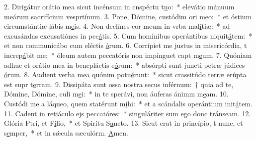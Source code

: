 2. Dirigátur orátio mea sicut incénsum in cnspéctu t\uline{u}o:~* elevátio mánuum meárum sacrifícium vesprt\uline{í}num.
3. Pone, Dómine, custódim ori m\uline{e}o:~* et óstium circumstántiæ lábis m\uline{e}is.
4. Non declínes cor meum in vrba mal\uline{í}tiæ:~* ad excusándas excusatiónes in pcc\uline{á}tis.
5. Cum homínibus operántibus niquit\uline{á}tem:~* et non communicábo cum eléctis \uline{ó}rum.
6. Corrípiet me justus in misericórdia, t increp\uline{á}bit me:~* óleum autem peccatóris non impínguet capt m\uline{e}um.
7. Quóniam adhuc et orátio mea in benepláctis e\uline{ó}rum:~* absórpti sunt juncti petræ júdices \uline{ó}rum.
8. Audient verba mea quónim potu\uline{é}runt:~* sicut crassitúdo terræ erúpta est supr t\uline{e}rram.
9. Dissipáta sunt ossa nostra secus inférnum:~† quia ad te, Dómine, Dómine, culi m\uline{e}i:~* in te sperávi, non áuferas ánimm m\uline{e}am.
10. Custódi me a láqueo, quem statérunt m\uline{i}hi:~* et a scándalis operántium init\uline{á}tem.
11. Cadent in retiáculo ejs peccat\uline{ó}res:~* singuláriter sum ego donc tr\uline{á}nseam.
12. Glória Ptri, et F\uline{í}lio,~* et Spirítu S\uline{a}ncto.
13. Sicut erat in princípio, t nunc, et s\uline{e}mper,~* et in sǽcula sæculórm. \uline{A}men.
